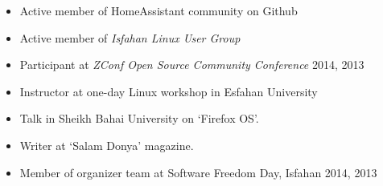 \begin{itemize}
\item Active member of HomeAssistant community on Github    
\item Active member of {\it Isfahan Linux User Group} \\
\item Participant at {\it ZConf Open Source Community Conference} 2014, 2013 \\
\item Instructor at one-day Linux workshop in Esfahan University \\
\item Talk in Sheikh Bahai University on `Firefox OS'. \\
\item Writer at `Salam Donya' magazine. \\
\item Member of organizer team at Software Freedom Day, Isfahan 2014, 2013 \\
\end{itemize}







